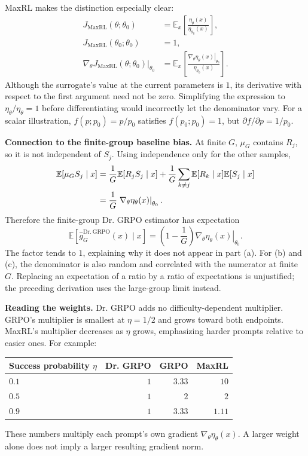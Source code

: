 \documentclass[11pt,a4paper]{article}
\newcommand{\E}{\mathbb{E}}
\begin{document}
MaxRL makes the distinction especially clear:
\begin{align}
  J_{\mathrm{MaxRL}}(\theta;\theta_0)
    &=\E_x\!\left[\frac{\eta_\theta(x)}{\eta_{\theta_0}(x)}\right],\\
  J_{\mathrm{MaxRL}}(\theta_0;\theta_0)&=1,\\
  \left.\nabla_\theta J_{\mathrm{MaxRL}}(\theta;\theta_0)\right|_{\theta_0}
    &=\E_x\!\left[\frac{\left.\nabla_\theta\eta_\theta(x)\right|_{\theta_0}}
                         {\eta_{\theta_0}(x)}\right].
\end{align}
Although the surrogate's value at the current parameters is $1$, its derivative
with respect to the first argument need not be zero. Simplifying the expression
to $\eta_\theta/\eta_\theta=1$ before differentiating would incorrectly let the
denominator vary. For a scalar illustration,
$f(p;p_0)=p/p_0$ satisfies $f(p_0;p_0)=1$, but
$\partial f/\partial p=1/p_0$.

\textbf{Connection to the finite-group baseline bias.}
At finite $G$, $\mu_G$ contains $R_j$, so it is not independent of $S_j$.
Using independence only for the other samples,
\begin{align}
  \E[\mu_GS_j\mid x]
  &=\frac{1}{G}\E[R_jS_j\mid x]
    +\frac{1}{G}\sum_{k\ne j}\E[R_k\mid x]\E[S_j\mid x] \notag\\
  &=\frac{1}{G}\left.\nabla_\theta\eta_\theta(x)\right|_{\theta_0}.
\end{align}
Therefore the finite-group Dr. GRPO estimator has expectation
\begin{equation}
  \E[\widehat g_G^{\mathrm{Dr.\,GRPO}}(x)\mid x]
  =\left(1-\frac{1}{G}\right)
    \left.\nabla_\theta\eta_\theta(x)\right|_{\theta_0}.
\end{equation}
The factor tends to $1$, explaining why it does not appear in part (a).
For (b) and (c), the denominator is also random and correlated with the
numerator at finite $G$. Replacing an expectation of a ratio by a ratio of
expectations is unjustified; the preceding derivation uses the large-group
limit instead.

\textbf{Reading the weights.}
Dr. GRPO adds no difficulty-dependent multiplier. GRPO's multiplier is
smallest at $\eta=1/2$ and grows toward both endpoints. MaxRL's multiplier
decreases as $\eta$ grows, emphasizing harder prompts relative to easier ones.
For example:
\begin{center}
\begin{tabular}{lrrr}
\toprule
Success probability $\eta$ & Dr. GRPO & GRPO & MaxRL \\
\midrule
$0.1$ & $1$ & $3.33$ & $10$ \\
$0.5$ & $1$ & $2$ & $2$ \\
$0.9$ & $1$ & $3.33$ & $1.11$ \\
\bottomrule
\end{tabular}
\end{center}
These numbers multiply each prompt's own gradient $\nabla_\theta\eta_\theta(x)$.
A larger weight alone does not imply a larger resulting gradient norm.
\end{document}
